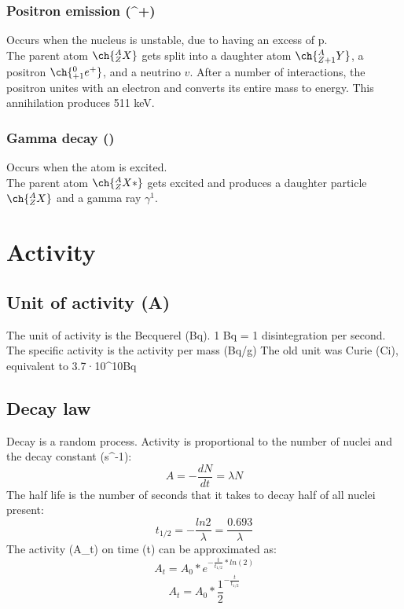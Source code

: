 \subsubsection{Positron emission (\beta^{+})}
Occurs when the nucleus is unstable, due to having an excess of p.\\
The parent atom $\ch{^{A}_{Z}X}$ gets split into a daughter atom $\ch{^{A}_{Z+1}Y}$, a positron $\ch{^{0}_{+1}e^{+}}$, and a neutrino $v$.
After a number of interactions, the positron unites with an electron and converts its entire mass to energy. This annihilation produces 511 keV.
\subsubsection{Gamma decay (\gamma)}
Occurs when the atom is excited.\\
The parent atom $\ch{^{A}_{Z}X*}$ gets excited and produces a daughter particle $\ch{^{A}_{Z}X}$ and a gamma ray $\gamma^{1}$.
\section{Activity}
\subsection{Unit of activity (A)}
The unit of activity is the Becquerel (Bq). 1 Bq = 1 disintegration per second.
The specific activity is the activity per mass (Bq/g)
The old unit was Curie (Ci), equivalent to 3.7·10^{10}Bq
 \subsection{Decay law}
 Decay is a random process. 
Activity is proportional to the number of nuclei and the decay constant \lambda (s^{-1}):
\[ A = -\frac{dN}{dt} = \lambda N \]
The half life is the number of seconds that it takes to decay half of all nuclei present:
\[ t_{1/2} = -\frac{ln2}{\lambda} = \frac{0.693}{\lambda} \]
The activity (A_t) on time (t) can be approximated as:
\[ A_{t} = A_0 * e^{-\frac{t}{t_{1/2}}*ln(2)} \]
\[ A_{t} = A_0 * \frac{1}{2}^{-\frac{t}{t_{1/2}}} \]
